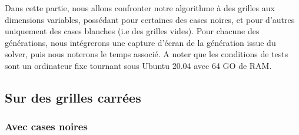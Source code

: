 \documentclass [ 11 pt ] {article}
\begin{document}
    Dans cette partie, nous allons confronter notre algorithme à des grilles aux dimensions variables, possédant pour certaines des cases noires, et pour d'autres uniquement des cases blanches (i.e des grilles vides). Pour chacune des générations, nous intégrerons une capture d'écran de la génération issue du solver, puis nous noterons le temps associé. A noter que les conditions de tests sont un ordinateur fixe tournant sous Ubuntu 20.04 avec 64 GO de RAM.

    \subsection{Sur des grilles carrées}
        \subsubsection{Avec cases noires}
\end{document}
